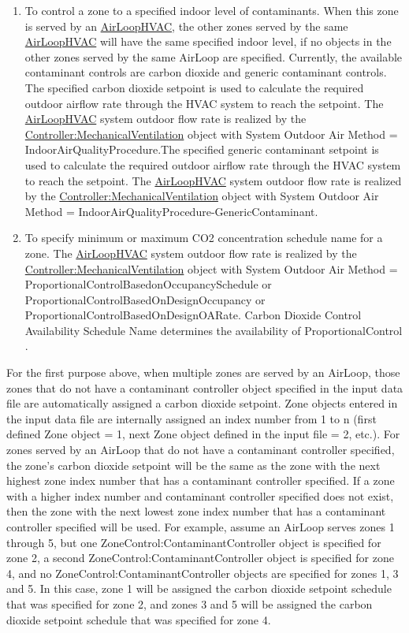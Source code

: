 \begin{enumerate}
\def\labelenumi{\arabic{enumi})}
\item
  To control a zone to a specified indoor level of contaminants. When this zone is served by an \hyperref[airloophvac]{AirLoopHVAC}, the other zones served by the same \hyperref[airloophvac]{AirLoopHVAC} will have the same specified indoor level, if no objects in the other zones served by the same AirLoop are specified. Currently, the available contaminant controls are carbon dioxide and generic contaminant controls. The specified carbon dioxide setpoint is used to calculate the required outdoor airflow rate through the HVAC system to reach the setpoint. The \hyperref[airloophvac]{AirLoopHVAC} system outdoor flow rate is realized by the \hyperref[controllermechanicalventilation]{Controller:MechanicalVentilation} object with System Outdoor Air Method = IndoorAirQualityProcedure.The specified generic contaminant setpoint is used to calculate the required outdoor airflow rate through the HVAC system to reach the setpoint. The \hyperref[airloophvac]{AirLoopHVAC} system outdoor flow rate is realized by the \hyperref[controllermechanicalventilation]{Controller:MechanicalVentilation} object with System Outdoor Air Method = IndoorAirQualityProcedure-GenericContaminant.
\item
  To specify minimum or maximum CO2 concentration schedule name for a zone. The \hyperref[airloophvac]{AirLoopHVAC} system outdoor flow rate is realized by the \hyperref[controllermechanicalventilation]{Controller:MechanicalVentilation} object with System Outdoor Air Method = ProportionalControlBasedonOccupancySchedule or ProportionalControlBasedOnDesignOccupancy or ProportionalControlBasedOnDesignOARate. Carbon Dioxide Control Availability Schedule Name determines the availability of ProportionalControl .
\end{enumerate}

For the first purpose above, when multiple zones are served by an AirLoop, those zones that do not have a contaminant controller object specified in the input data file are automatically assigned a carbon dioxide setpoint. Zone objects entered in the input data file are internally assigned an index number from 1 to n (first defined Zone object = 1, next Zone object defined in the input file = 2, etc.). For zones served by an AirLoop that do not have a contaminant controller specified, the zone's carbon dioxide setpoint will be the same as the zone with the next highest zone index number that has a contaminant controller specified. If a zone with a higher index number and contaminant controller specified does not exist, then the zone with the next lowest zone index number that has a contaminant controller specified will be used. For example, assume an AirLoop serves zones 1 through 5, but one ZoneControl:ContaminantController object is specified for zone 2, a second ZoneControl:ContaminantController object is specified for zone 4, and no ZoneControl:ContaminantController objects are specified for zones 1, 3 and 5. In this case, zone 1 will be assigned the carbon dioxide setpoint schedule that was specified for zone 2, and zones 3 and 5 will be assigned the carbon dioxide setpoint schedule that was specified for zone 4.

